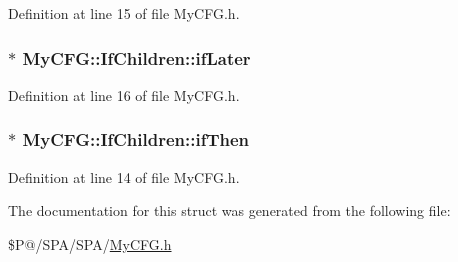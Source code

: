 Definition at line 15 of file My\-C\-F\-G.\-h.

\hypertarget{struct_my_c_f_g_1_1_if_children_a0ff9f7a5cf8866b51ee2a9ff3f2669d7}{
\subsubsection[{if\-Later}]{$\ast$ My\-C\-F\-G\-::\-If\-Children\-::if\-Later}}\label{struct_my_c_f_g_1_1_if_children_a0ff9f7a5cf8866b51ee2a9ff3f2669d7}


Definition at line 16 of file My\-C\-F\-G.\-h.

\hypertarget{struct_my_c_f_g_1_1_if_children_a54acb9f7d3f9209e69d738c4e8ef7d69}{
\subsubsection[{if\-Then}]{$\ast$ My\-C\-F\-G\-::\-If\-Children\-::if\-Then}}\label{struct_my_c_f_g_1_1_if_children_a54acb9f7d3f9209e69d738c4e8ef7d69}


Definition at line 14 of file My\-C\-F\-G.\-h.



The documentation for this struct was generated from the following file\-:\begin{DoxyCompactItemize}
\item 
\$\-P@/\-S\-P\-A/\-S\-P\-A/\hyperlink{_my_c_f_g_8h}{My\-C\-F\-G.\-h}\end{DoxyCompactItemize}
